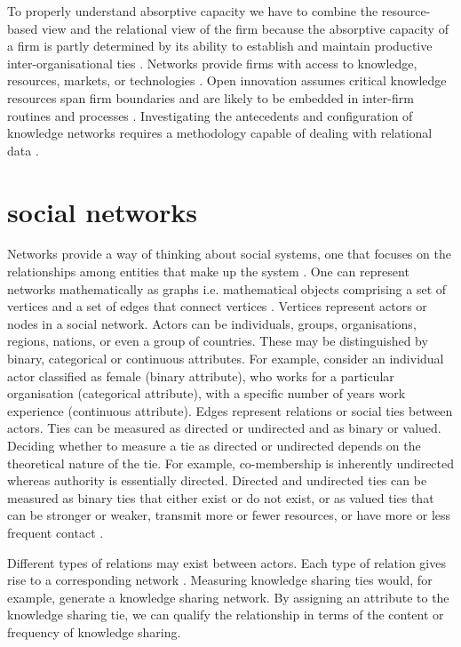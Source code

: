 
To properly understand absorptive capacity we have to combine the resource-based view and the relational view of the firm because the absorptive capacity of a firm is partly determined by its ability to establish and maintain productive inter-organisational ties \citep{vanhaverbeke2007connecting}. Networks provide firms with access to knowledge, resources, markets, or technologies \citep{inkpen2005social}. Open innovation assumes critical knowledge resources span firm boundaries and are likely to be embedded in inter-firm routines and processes \citep{dyer1998relational,chesbrough2003open}. Investigating the antecedents and configuration of knowledge networks requires a methodology capable of dealing with relational data \citep{lusher2014cooperative}.  

\section{social networks}

Networks provide a way of thinking about social systems, one that focuses on the relationships among entities that make up the system \citep{borgatti2013analyzing,robins2015doing}. One can represent networks mathematically as graphs i.e. mathematical objects comprising a set of vertices and a set of edges that connect vertices \citep{newman2010networks}. Vertices represent actors or nodes in a social network. Actors can be individuals, groups, organisations, regions, nations, or even a group of countries. These may be distinguished by binary, categorical or continuous attributes. For example, consider an individual actor classified as female (binary attribute), who works for a particular organisation (categorical attribute), with a specific number of years work experience (continuous attribute). Edges represent relations or social ties between actors. Ties can be measured as directed or undirected and as binary or valued. Deciding whether to measure a tie as directed or undirected depends on the theoretical nature of the tie. For example, co-membership is inherently undirected whereas authority is essentially directed. Directed and undirected ties can be measured as binary ties that either exist or do not exist, or as valued ties that can be stronger or weaker, transmit more or fewer resources, or have more or less frequent contact \citep{scott2011sage}.\medskip

Different types of relations may exist between actors. Each type of relation gives rise to a corresponding network \citep{borgatti2013analyzing}. Measuring knowledge sharing ties would, for example, generate a knowledge sharing network. By assigning an attribute to the knowledge sharing tie, we can qualify the relationship in terms of the content or frequency of knowledge sharing. \medskip

